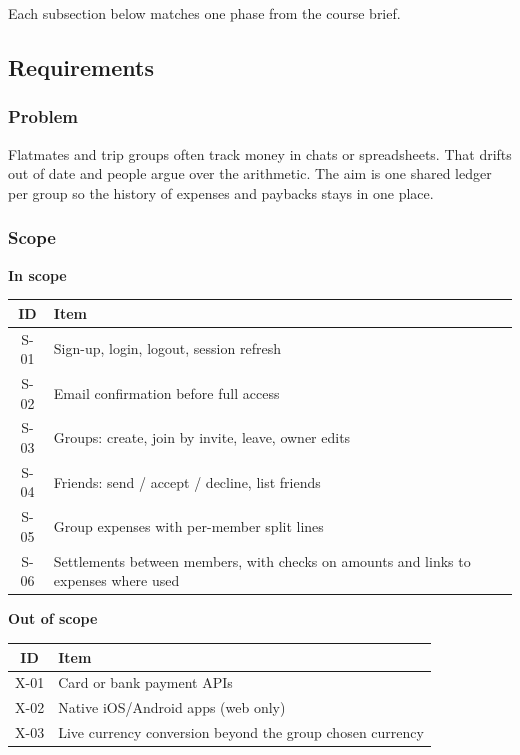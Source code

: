 \documentclass[11pt,a4paper]{article}
\begin{document}
Each subsection below matches one phase from the course brief.

\subsection{Requirements}

\subsubsection{Problem}

Flatmates and trip groups often track money in chats or spreadsheets. That drifts out of date and people argue over the arithmetic. The aim is one shared ledger per group so the history of expenses and paybacks stays in one place.

\subsubsection{Scope}

\textbf{In scope}

\begin{center}
\begin{tabular}{@{}cl@{}}
\toprule
\textbf{ID} & \textbf{Item} \\
\midrule
S-01 & Sign-up, login, logout, session refresh \\
S-02 & Email confirmation before full access \\
S-03 & Groups: create, join by invite, leave, owner edits \\
S-04 & Friends: send / accept / decline, list friends \\
S-05 & Group expenses with per-member split lines \\
S-06 & Settlements between members, with checks on amounts and links to expenses where used \\
\bottomrule
\end{tabular}
\end{center}

\vspace{1em}
\textbf{Out of scope}

\begin{center}
\begin{tabular}{@{}cl@{}}
\toprule
\textbf{ID} & \textbf{Item} \\
\midrule
X-01 & Card or bank payment APIs \\
X-02 & Native iOS/Android apps (web only) \\
X-03 & Live currency conversion beyond the group chosen currency \\
\bottomrule
\end{tabular}
\end{center}
\end{document}
